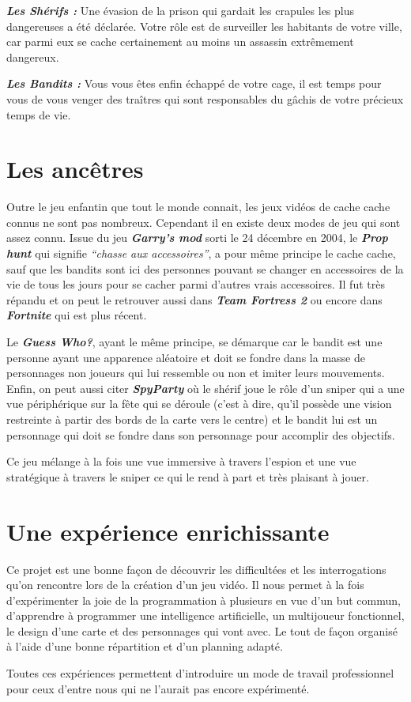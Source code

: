\documentclass[12pt]{report}
\begin{document}
            \par \textbf{\textit{Les Shérifs :}} Une évasion de la prison qui gardait les crapules les plus dangereuses a été déclarée. Votre rôle est de surveiller les habitants de votre ville, car parmi eux se cache certainement au moins un assassin extrêmement dangereux.\\
            \par \textbf{\textit{Les Bandits :}} Vous vous êtes enfin échappé de votre cage, il est temps pour vous de vous venger des traîtres qui sont responsables du gâchis de votre précieux temps de vie.
        \section{Les ancêtres}
            \par Outre le jeu enfantin que tout le monde connait, les jeux vidéos de cache cache     connus ne sont pas nombreux. Cependant il en existe deux modes de jeu qui sont assez connu. Issue du jeu \textit{\textbf{Garry’s mod}} sorti le 24 décembre en 2004, le \textit{\textbf{Prop hunt}} qui signifie \textit{“chasse aux accessoires”}, a pour même principe le cache cache, sauf que les bandits sont ici des personnes pouvant se changer en accessoires de la vie de tous les jours pour se cacher parmi d’autres vrais accessoires. Il fut très répandu et on peut le retrouver aussi dans \textbf{\textit{Team Fortress 2}} ou encore dans \textbf{\textit{Fortnite}} qui est plus récent.\\ \par Le \textbf{\textit{Guess Who?}}, ayant le même principe, se démarque car le bandit est une personne ayant une apparence aléatoire et doit se fondre dans la masse de personnages non joueurs qui lui ressemble ou non et imiter leurs mouvements. Enfin, on peut aussi citer \textbf{\textit{SpyParty}} où le shérif joue le rôle d’un sniper qui a une vue périphérique sur la fête qui se déroule (c’est à dire, qu’il possède une vision restreinte à partir des bords de la carte vers le centre) et le bandit lui est un personnage qui doit se fondre dans son personnage pour accomplir des objectifs. \par Ce jeu mélange à la fois une vue immersive à travers l’espion et une vue stratégique à travers le sniper ce qui le rend à part et très plaisant à jouer.
        \section{Une expérience enrichissante}
            Ce projet est une bonne façon de découvrir les difficultées et les interrogations qu’on rencontre lors de la création d’un jeu vidéo. Il nous permet à la fois d’expérimenter la joie de la programmation à plusieurs en vue d’un but commun, d’apprendre à programmer une intelligence artificielle, un multijoueur fonctionnel, le design d’une carte et des personnages qui vont avec. Le tout de façon organisé à l’aide d’une bonne répartition et d’un planning adapté. \\ \par Toutes ces expériences permettent d’introduire un mode de travail professionnel pour ceux d’entre nous qui ne l’aurait pas encore expérimenté. 
\end{document}
